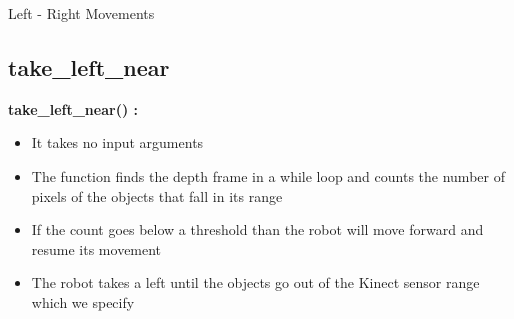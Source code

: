 \documentclass[10pt, a4paper]{beamer}
\begin{document}
\begin{frame}[allowframebreaks]{Left - Right Movements}
  \subsection{take\_left\_near}
    \textbf{take\_left\_near() : }
      \begin{itemize}
       \item It takes no input arguments
       \item The function finds the depth frame in a while loop and counts the number of pixels of the objects that fall in its range
       \item If the count goes below a threshold than the robot will move forward and resume its movement
       \item The robot takes a left until the objects go out of the Kinect sensor range which we specify
      \end{itemize}
\end{frame}
\end{document}
